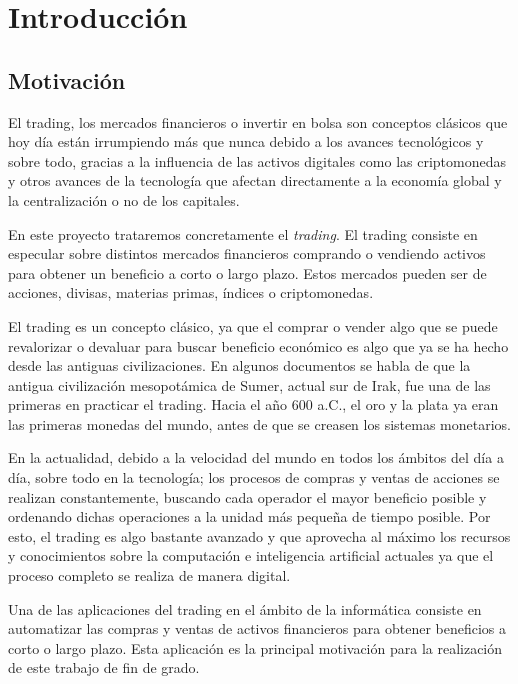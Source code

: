 
\chapter{Introducción} \label{introduccion}

\section{Motivación}

El trading, los mercados financieros o invertir en bolsa son conceptos clásicos que hoy día están irrumpiendo más que nunca debido a los avances tecnológicos y sobre todo, gracias a la influencia de las activos digitales como las criptomonedas y otros avances de la tecnología que afectan directamente a la economía global y la centralización o no de los capitales. \newline

En este proyecto trataremos concretamente el \textit{trading}. El trading consiste en especular sobre distintos mercados financieros comprando o vendiendo activos para obtener un beneficio a corto o largo plazo. Estos mercados pueden ser de acciones, divisas, materias primas, índices o criptomonedas. \newline

El trading es un concepto clásico, ya que el comprar o vender algo que se puede revalorizar o devaluar para buscar beneficio económico es algo que ya se ha hecho desde las antiguas civilizaciones. En algunos documentos se habla de que la antigua civilización mesopotámica de Sumer, actual sur de Irak, fue una de las primeras en practicar el trading. Hacia el año 600 a.C., el oro y la plata ya eran las primeras monedas del mundo, antes de que se creasen los sistemas monetarios. \newline

En la actualidad, debido a la velocidad del mundo en todos los ámbitos del día a día, sobre todo en la tecnología; los procesos de compras y ventas de acciones se realizan constantemente, buscando cada operador el mayor beneficio posible y ordenando dichas operaciones a la unidad más pequeña de tiempo posible. Por esto, el trading es algo bastante avanzado y que aprovecha al máximo los recursos y conocimientos sobre la computación e inteligencia artificial actuales ya que el proceso completo se realiza de manera digital. \newline

Una de las aplicaciones del trading en el ámbito de la informática consiste en automatizar las compras y ventas de activos financieros para obtener beneficios a corto o largo plazo. Esta aplicación es la principal motivación para la realización de este trabajo de fin de grado. \newline

